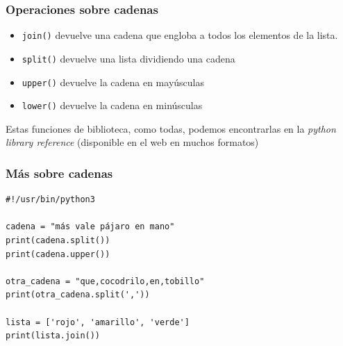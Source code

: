 \begin{frame}[fragile]
\frametitle{Operaciones sobre cadenas}

\begin{itemize}
\item \verb|join()| devuelve una cadena que engloba a todos los elementos de la lista.\\
\item \verb|split()| devuelve una lista dividiendo una cadena\\
\item \verb|upper()| devuelve la cadena en mayúsculas\\
\item \verb|lower()| devuelve la cadena en minúsculas\\
\end{itemize}

Estas funciones de biblioteca, como todas, podemos encontrarlas
en la \emph{python library reference}
(disponible en el web en muchos formatos)

\end{frame}



\begin{frame}[fragile]

\frametitle{Más sobre cadenas}  

  \begin{footnotesize}
\begin{verbatim}
#!/usr/bin/python3

cadena = "más vale pájaro en mano"
print(cadena.split())
print(cadena.upper())

otra_cadena = "que,cocodrilo,en,tobillo"
print(otra_cadena.split(','))

lista = ['rojo', 'amarillo', 'verde']
print(lista.join())

\end{verbatim}
  \end{footnotesize}



  
\end{frame}

